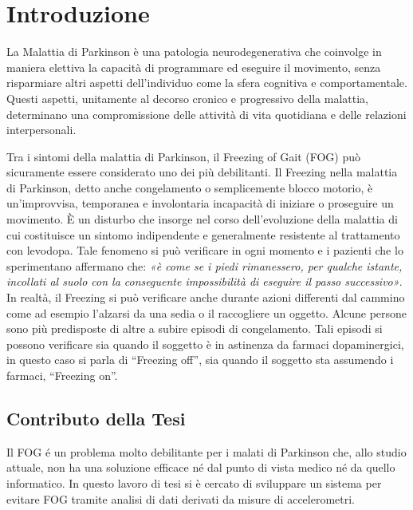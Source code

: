 


\chapter{Introduzione}\label{cap1:Introduzione}

La Malattia di Parkinson è una patologia neurodegenerativa che coinvolge in maniera elettiva la capacità di programmare ed eseguire il movimento, senza risparmiare altri aspetti dell’individuo come la sfera cognitiva e comportamentale. Questi aspetti, unitamente al decorso cronico e progressivo della malattia, determinano una compromissione delle attività di vita quotidiana e delle relazioni interpersonali.

Tra i sintomi della malattia di Parkinson, il Freezing of Gait (FOG) può sicuramente essere considerato uno dei più debilitanti. Il Freezing nella malattia di Parkinson, detto anche congelamento o semplicemente blocco motorio, è un’improvvisa, temporanea e involontaria incapacità di iniziare o proseguire un movimento. È un disturbo che insorge nel corso dell’evoluzione della malattia di cui costituisce un sintomo indipendente e generalmente resistente al trattamento con levodopa. Tale fenomeno si può verificare in ogni momento e i pazienti che lo sperimentano affermano che: \textit{«è come se i piedi rimanessero, per qualche istante, incollati al suolo con la conseguente impossibilità di eseguire il passo successivo»}. In realtà, il Freezing si può verificare anche durante azioni differenti dal cammino come ad esempio l’alzarsi da una sedia o il raccogliere un oggetto. Alcune persone sono più predisposte di altre a subire episodi di congelamento. Tali episodi si possono verificare sia quando il soggetto è in astinenza da farmaci dopaminergici, in questo caso si parla di “Freezing off”, sia quando il soggetto sta assumendo i farmaci, “Freezing on”. \\

\section{Contributo della Tesi}\label{cap1:Contributo della Tesi}
Il FOG é un problema molto debilitante per i malati di Parkinson che, allo studio attuale, non ha una soluzione efficace né dal punto di vista medico né da quello informatico. In questo lavoro di tesi si è cercato di sviluppare un sistema per evitare FOG tramite analisi di dati derivati da misure di accelerometri.\\


